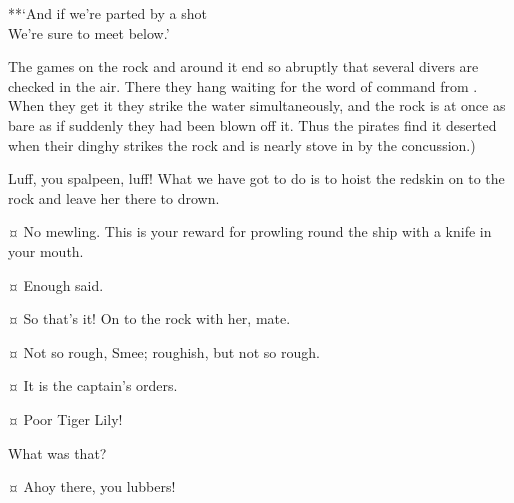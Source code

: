 \begin{drama}
\begin{stagedir}
\begin{drama}
\speakercontinues
	**‘And if we’re parted by a shot\\
	We’re sure to meet below.’
\end{drama}

The games on the rock and around it end so abruptly that several divers are checked in the air.
There they hang waiting for the word of command from \peter.
When they get it they strike the water simultaneously, and the rock is at once as bare as if suddenly they had been blown off it.
Thus the pirates find it deserted when their dinghy strikes the rock and is nearly stove in by the concussion.)
\end{stagedir}

\smeespeaks
Luff, you spalpeen, luff!
What we have got to do is to hoist the redskin on to the rock and leave her there to drown.


\starkeyspeaks {}¤
No mewling.
This is your reward for prowling round the ship with a knife in your mouth.

\tigerlilyspeaks {}¤
Enough said.

\smeespeaks {}¤
So that’s it!
On to the rock with her, mate.

\starkeyspeaks {}¤
Not so rough, Smee; roughish, but not so rough.

\smeespeaks {}¤
It is the captain’s orders.


\wendyspeaks {}¤
Poor Tiger Lily!

\starkeyspeaks
What was that?

\peterspeaks {}¤
Ahoy there, you lubbers!


\end{drama}
